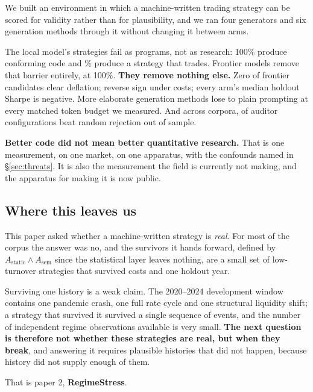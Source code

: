 \documentclass[11pt,a4paper]{article}
\begin{document}
We built an environment in which a machine-written trading strategy can be scored for validity
rather than for plausibility, and we ran four generators and six generation methods through it
without changing it between arms.

The local model's strategies fail as programs, not as research: 100\% produce conforming code and
\pgmLocalTrade\% produce a strategy that trades. Frontier models remove that barrier entirely, at
100\%. \textbf{They remove nothing else.} Zero of \aaGvTotal{} frontier candidates clear
deflation; \aaGvFlipsTotal{} reverse sign under costs; every arm's median holdout Sharpe is
negative. More elaborate generation methods lose to plain prompting at every matched token budget
we measured. And across \pgmNullCorpora{} corpora, \pgmNullBeating{} of \pgmNullCombos{} auditor
configurations beat random rejection out of sample.

\begin{finding}
\textbf{Better code did not mean better quantitative research.} That is one measurement, on one
market, on one apparatus, with the confounds named in \S\ref{sec:threats}. It is also the
measurement the field is currently not making, and the apparatus for making it is now public.
\end{finding}

\subsection*{Where this leaves us}

This paper asked whether a machine-written strategy is \emph{real}. For most of the corpus the
answer was no, and the survivors it hands forward, defined by
$A_{\mathrm{static}} \wedge A_{\mathrm{sem}}$ since the statistical layer leaves nothing, are
a small set of low-turnover strategies that survived costs and one holdout year.

Surviving one history is a weak claim. The 2020--2024 development window contains one pandemic
crash, one full rate cycle and one structural liquidity shift; a strategy that survived it
survived a single sequence of events, and the number of independent regime observations available
is very small. \textbf{The next question is therefore not whether these strategies are real, but
when they break}, and answering it requires plausible histories that did not happen, because
history did not supply enough of them.

That is paper 2, \textbf{RegimeStress}.
\end{document}
